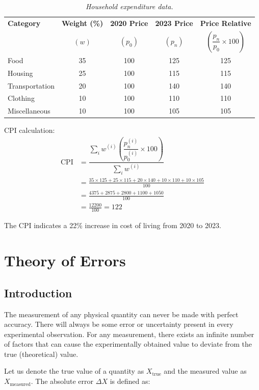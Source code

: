 \documentclass[twoside]{book}
\begin{document}
\begin{table}[H]
\centering
\begin{tabular}{lcccc}
\toprule
\textbf{Category} & \textbf{Weight (\%)} & \textbf{2020 Price} & \textbf{2023 Price} & \textbf{Price Relative} \\
& $(w)$ & $(p_0)$ & $(p_n)$ & $\left(\dfrac{p_n}{p_0}\times 100\right) $ \\
\midrule
Food & 35 & 100 & 125 & 125 \\
Housing & 25 & 100 & 115 & 115 \\
Transportation & 20 & 100 & 140 & 140 \\
Clothing & 10 & 100 & 110 & 110 \\
Miscellaneous & 10 & 100 & 105 & 105 \\
\bottomrule
\end{tabular}
\caption{\textit{Household expenditure data.}}
\end{table}

CPI calculation:
\begin{align*}
\text{CPI} &= \dfrac{\displaystyle \sum_i w^{(i)} \left( \dfrac{p_n^{(i)}}{p_0^{(i)}} \times 100 \right)}{\displaystyle \sum_i w^{(i)}} \\
&= \frac{35 \times 125 + 25 \times 115 + 20 \times 140 + 10 \times 110 + 10 \times 105}{100} \\
&= \frac{4375 + 2875 + 2800 + 1100 + 1050}{100} \\
&= \frac{12200}{100} = 122
\end{align*}

The CPI indicates a 22\% increase in cost of living from 2020 to 2023.


\chapter{Theory of Errors}

\section{Introduction}

The measurement of any physical quantity can never be made with perfect accuracy. There will always be some error or uncertainty present in every experimental observation. For any measurement, there exists an infinite number of factors that can cause the experimentally obtained value to deviate from the true (theoretical) value.

Let us denote the true value of a quantity as $X_{\text{true}}$ and the measured value as $X_{\text{measured}}$. The absolute error $\Delta X$ is defined as:
\end{document}
